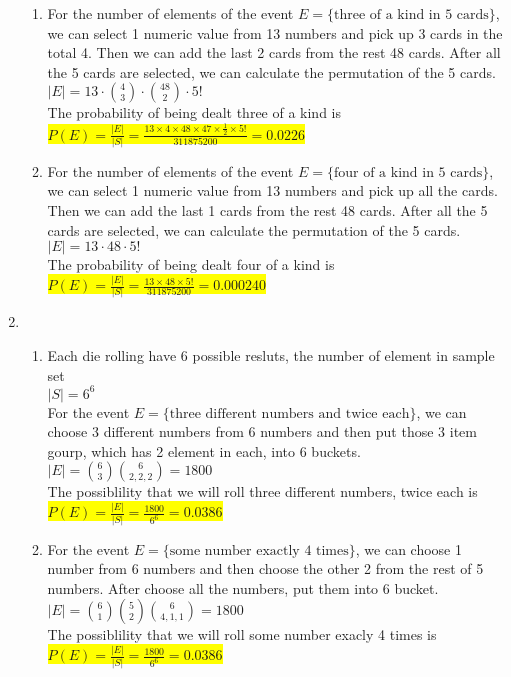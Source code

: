 \documentclass{article}
\begin{document}
\begin{enumerate}
\begin{enumerate}
		\item
		\mysolu
		For the number of elements of the event ${E=\{\text{three of a kind in 5 cards}\}}$, we can select 1 numeric value from 13 numbers and pick up 3 cards in the total 4. Then we can add the last 2 cards from the rest 48 cards. After all the 5 cards are selected, we can calculate the permutation of the 5 cards.\\
		${|E|=13\cdot{4 \choose 3} \cdot{48 \choose 2}\cdot 5!}$\\
		\myansw
		The probability of being dealt three of a kind is\\
		\colorbox{yellow}{
			${P(E)=\frac{|E|}{|S|}=\frac{13\times4\times48\times47\times \frac{1}{2} \times 5!}{311875200}=0.0226}$
		}
		
		\item
		\mysolu
		For the number of elements of the event ${E=\{\text{four of a kind in 5 cards}\}}$, we can select 1 numeric value from 13 numbers and pick up all the cards. Then we can add the last 1 cards from the rest 48 cards. After all the 5 cards are selected, we can calculate the permutation of the 5 cards.\\
		${|E|=13\cdot 48\cdot 5!}$\\
		\myansw
		The probability of being dealt four of a kind is\\
		\colorbox{yellow}{
			${P(E)=\frac{|E|}{|S|}=\frac{13\times48 \times 5!}{311875200}=0.000240}$
		}		
		

	\end{enumerate}
	\item
	\begin{enumerate}
		\item
		Each die rolling have 6 possible resluts, the number of element in sample set\\
		${|S| = 6^6}$\\
		For the event ${E=\{\text{three different numbers and twice each}\}}$, we can choose 3 different numbers from 6 numbers and then put those 3 item gourp, which has 2 element in each, into 6 buckets.\\
		${|E|={6 \choose 3}{6 \choose 2,2,2}=1800}$\\
		\myansw
		The possiblility that we will roll three different numbers, twice each is\\
		\colorbox{yellow}{
			${P(E)=\frac{|E|}{|S|}=\frac{1800}{6^6}=0.0386}$
		}
		
		\item
		For the event ${E=\{\text{some number exactly 4 times}\}}$, we can choose 1 number from 6 numbers and then choose the other 2 from the rest of 5 numbers. After choose all the numbers, put them into 6 bucket.\\
		${|E|={6 \choose 1}{5 \choose 2}{6 \choose 4, 1, 1}=1800}$\\
		\myansw
		The possiblility that we will roll some number exacly 4 times is\\
		\colorbox{yellow}{
			${P(E)=\frac{|E|}{|S|}=\frac{1800}{6^6}=0.0386}$
		}
	\end{enumerate}


\end{enumerate}
\end{document}
